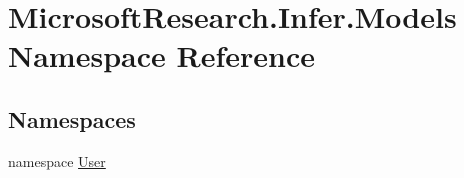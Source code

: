 \hypertarget{namespace_microsoft_research_1_1_infer_1_1_models}{}\section{Microsoft\+Research.\+Infer.\+Models Namespace Reference}
\label{namespace_microsoft_research_1_1_infer_1_1_models}
\subsection*{Namespaces}
\begin{DoxyCompactItemize}
\item 
namespace \hyperlink{namespace_microsoft_research_1_1_infer_1_1_models_1_1_user}{User}
\end{DoxyCompactItemize}
